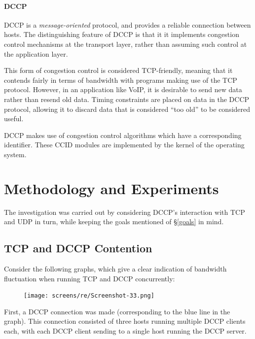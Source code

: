 \documentclass[10pt,a4paper]{article}
\begin{document}
\paragraph{DCCP}
DCCP is a \emph{message-oriented} protocol, and provides a reliable connection between hosts. 
The distinguishing feature of DCCP is that it it implements congestion control mechanisms at the transport layer,
 rather than assuming such control at the application layer.

This form of congestion control is considered TCP-friendly, meaning that it contends fairly in terms of bandwidth with programs making
use of the TCP protocol. However, in an application like VoIP, it is desirable to send new data rather than resend old data. Timing
constraints are placed on data in the DCCP protocol, allowing it to discard data that is considered ``too old'' to be considered
useful. 

DCCP makes use of congestion control algorithms which have a corresponding identifier. These CCID modules are implemented by
the kernel of the operating system. 


\section{Methodology and Experiments}
The investigation was carried out by considering DCCP's interaction with TCP and
UDP in turn, while keeping the goals mentioned of
\S\ref{goals} in mind.

\subsection{TCP and DCCP Contention}
\label{tcpdccp}

Consider the following graphs, which give a clear indication of bandwidth fluctuation when running TCP and DCCP 
concurrently:

\newpage

\begin{figure}[!h]
\begin{center}
\hspace*{-65pt}
\texttt{[image: screens/re/Screenshot-33.png]}
\end{center}
\end{figure}

First, a DCCP connection was made (corresponding to the blue line in the graph).
This connection consisted of three hosts running multiple
DCCP clients each, with each DCCP client sending to a single host running the
DCCP server.
\end{document}
